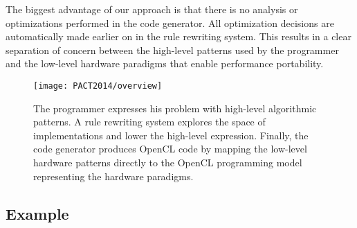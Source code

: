 The biggest advantage of our approach is that there is no analysis or optimizations performed in the code generator.
All optimization decisions are automatically made earlier on in the rule rewriting system.
This results in a clear separation of concern between the high-level patterns used by the programmer and the low-level hardware paradigms that enable performance portability.

\begin{figure}[t]
\centering
\texttt{[image: PACT2014/overview]}
\vspace{-15pt}
\caption{
The programmer expresses his problem with high-level algorithmic patterns.
A rule rewriting system explores the space of implementations and lower the high-level expression.
Finally, the code generator produces OpenCL code by mapping the low-level hardware patterns directly to the OpenCL programming model representing the hardware paradigms.}
\label{fig:highlevel}
\end{figure}


\subsection{Example}

